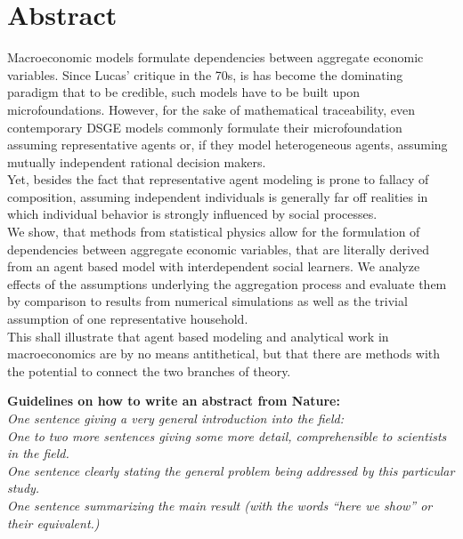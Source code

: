 

\section{Abstract}

Macroeconomic models formulate dependencies between aggregate economic variables. Since Lucas' critique in the 70s, is has become the dominating paradigm that to be credible, such models have to be built upon microfoundations. However, for the sake of mathematical traceability, even contemporary DSGE models commonly formulate their microfoundation assuming representative agents or, if they model heterogeneous agents, assuming mutually independent rational decision makers. \\
Yet, besides the fact that representative agent modeling is prone to fallacy of composition, assuming independent individuals is generally far off realities in which individual behavior is strongly influenced by social processes. \\
We show, that methods from statistical physics allow for the formulation of dependencies between aggregate economic variables, that are literally derived from an agent based model with interdependent social learners. 
We analyze effects of the assumptions underlying the aggregation process and evaluate them by comparison to results from numerical simulations as well as the trivial assumption of one representative household. \\
This shall illustrate that agent based modeling and analytical work in macroeconomics are by no means antithetical, but that there are methods with the potential to connect the two branches of theory. \\

\newpage

\textbf{Guidelines on how to write an abstract from Nature:}\\

\emph{One sentence giving a very general introduction into the field:} \\

\emph{One to two more sentences giving some more detail, comprehensible to scientists in the field.} \\

\emph{One sentence clearly stating the general problem being addressed by this particular study.} \\

\emph{One sentence summarizing the main result (with the words ``here we show'' or their equivalent.)} \\

